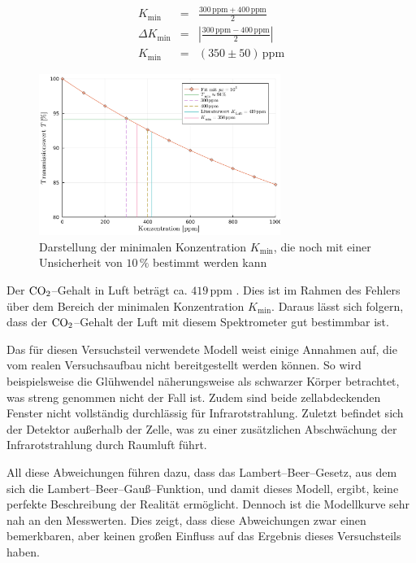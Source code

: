 \documentclass[12pt,a4paper]{scrartcl}
\numberwithin{equation}{section} %
\begin{document}
\begin{eqnarray}
  K_\mathrm{min} &=&  \frac{300 \mathrm{\, ppm} + 400 \mathrm{\, ppm}}{2} \\
  \Delta K_\mathrm{min} &=& \left|\frac{300 \mathrm{\, ppm} - 400 \mathrm{\, ppm}}{2}\right| \\
  K_\mathrm{min} &=& (350 \pm 50) \mathrm{\, ppm}
\end{eqnarray}

\begin{figure}[h]
  \centering
  \includegraphics[width=0.7\textwidth]{../media/B1.1/fitZoomPpm.pdf}
  \caption{Darstellung der minimalen Konzentration $K_\mathrm{min}$,
    die noch mit einer Unsicherheit von $10 \mathrm{\, \%}$ bestimmt werden kann}
  \label{abb:fitZoom}
\end{figure}

\noindent
Der $\ce{CO_2}$--Gehalt in Luft beträgt ca. $419 \mathrm{\, ppm}$ \cite{Kohlendioxid Anteil}.
Dies ist im Rahmen des Fehlers über dem Bereich der minimalen Konzentration $K_\mathrm{min}$. Daraus lässt sich folgern, dass der $\ce{CO_2}$--Gehalt der Luft mit diesem Spektrometer gut bestimmbar ist.

Das für diesen Versuchsteil verwendete Modell weist einige Annahmen auf, die vom realen Versuchsaufbau nicht bereitgestellt werden können. So wird beispielsweise die Glühwendel näherungsweise als schwarzer Körper betrachtet, was streng genommen nicht der Fall ist. Zudem sind beide zellabdeckenden Fenster nicht vollständig durchlässig für Infrarotstrahlung. Zuletzt befindet sich der Detektor außerhalb der Zelle, was zu einer zusätzlichen Abschwächung der Infrarotstrahlung durch Raumluft führt.

All diese Abweichungen führen dazu, dass das Lambert--Beer--Gesetz, aus dem sich die Lambert--Beer--Gauß--Funktion, und damit dieses Modell, ergibt, keine perfekte Beschreibung der Realität ermöglicht. Dennoch ist die Modellkurve sehr nah an den Messwerten. Dies zeigt, dass diese Abweichungen zwar einen bemerkbaren, aber keinen großen Einfluss auf das Ergebnis dieses Versuchsteils haben.
\end{document}
